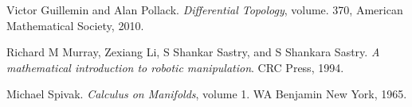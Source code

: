\documentclass[reqno]{amsart}
\theoremstyle{definition}
\numberwithin{equation}{section}
\begin{document}
\begin{thebibliography}{9}

Victor Guillemin and Alan Pollack. \textit{Differential Topology}, volume. 370, American Mathematical Society, 2010.

Richard M Murray, Zexiang Li, S Shankar Sastry, and S Shankara Sastry. \textit{A mathematical introduction to robotic manipulation}. CRC Press, 1994.

Michael Spivak. \textit{Calculus on Manifolds}, volume 1. WA Benjamin New York, 1965.



\end{thebibliography}
\end{document}
